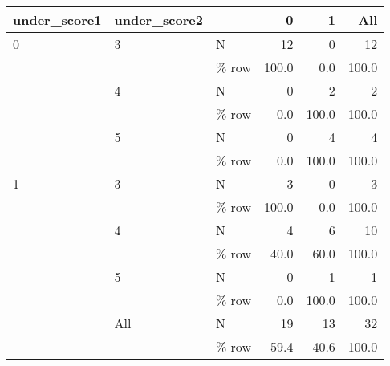 \begin{table}
\centering
\begin{tabular}[t]{lllrrr}
\toprule
under\_score1 & under\_score2 &   & 0 & 1 & All\\
\midrule
0 & 3 & N & 12 & 0 & 12\\
 &  & \% row & 100.0 & 0.0 & 100.0\\
 & 4 & N & 0 & 2 & 2\\
 &  & \% row & 0.0 & 100.0 & 100.0\\
 & 5 & N & 0 & 4 & 4\\
 &  & \% row & 0.0 & 100.0 & 100.0\\
1 & 3 & N & 3 & 0 & 3\\
 &  & \% row & 100.0 & 0.0 & 100.0\\
 & 4 & N & 4 & 6 & 10\\
 &  & \% row & 40.0 & 60.0 & 100.0\\
 & 5 & N & 0 & 1 & 1\\
 &  & \% row & 0.0 & 100.0 & 100.0\\
 & All & N & 19 & 13 & 32\\
 &  & \% row & 59.4 & 40.6 & 100.0\\
\bottomrule
\end{tabular}
\end{table}
